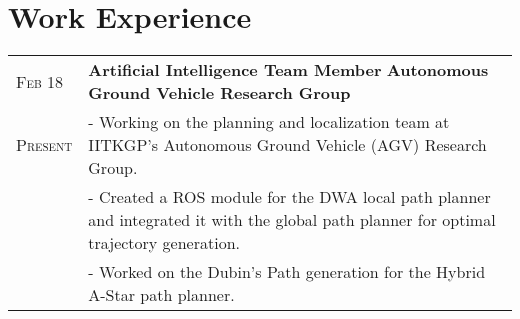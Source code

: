 \documentclass[a4paper,10pt]{extarticle} %
\begin{document}
  \section{\textcolor{primary}{Work Experience}}
  \begin{tabularx}{\linewidth}{ l | X }
  \textsc{Feb 18} & \textbf{Artificial Intelligence Team Member} \hfill\textbf{Autonomous Ground Vehicle Research Group}\\
  \textsc{Present} & {- Working on the planning and localization team at IITKGP's Autonomous Ground Vehicle (AGV) Research Group.}\\
  & {- Created a ROS module for the DWA local path planner and integrated it with the global path planner for optimal trajectory generation.}\\
  & {- Worked on the Dubin's Path generation for the Hybrid A-Star path planner.}
  \end{tabularx}
  
  
  \vspace{-0.1cm}
\end{document}
